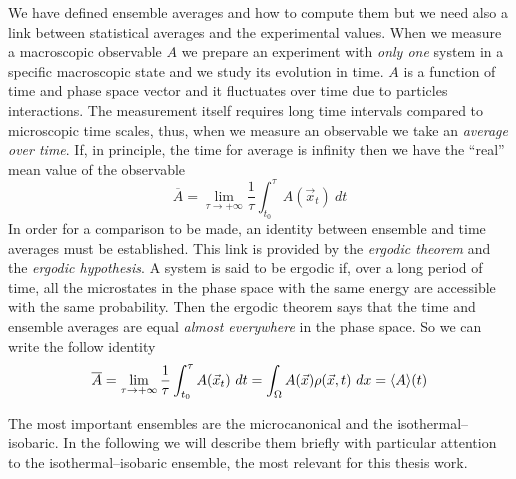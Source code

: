 We have defined ensemble averages and how to compute them but we need also a link between statistical averages and the experimental values. When we measure a macroscopic observable $A$ we prepare an experiment with \textit{only one} system in a specific macroscopic state and we study its evolution in time. $A$ is a function of time and phase space vector and it fluctuates over time due to particles interactions. The measurement itself requires long time intervals compared to microscopic time scales, thus, when we measure an observable we take an \textit{average over time}.
If, in principle, the time for average is infinity then we have the ``real'' mean value of the observable
\begin{equation*}
	\overline{A} = \lim_{\tau\to +\infty}\frac{1}{\tau}\int_{t_0}^\tau A(\vec x_t)\ dt
	\label{eq:timeAve}
\end{equation*}
In order for a comparison to be made, an identity between ensemble and time averages must be established.
This link is provided by the \textit{ergodic theorem} and the \textit{ergodic hypothesis}. A system is said to be ergodic if, over a long period of time, all the microstates in the phase space with the same energy are accessible with the same probability. Then the ergodic theorem says that the time and ensemble averages are equal \textit{almost everywhere} in the phase space. So we can write the follow identity
\begin{equation*}
	\overline{A} = \lim_{\tau\to +\infty}\frac{1}{\tau}\int_{t_0}^\tau A(\vec x_t)\ dt = \int_\Omega A(\vec x)\rho(\vec x, t)\ dx = \langle A \rangle(t)
\end{equation*}

The most important ensembles are the microcanonical and the isothermal--isobaric. In the following we will describe them briefly with particular attention to the isothermal--isobaric ensemble, the most relevant for this thesis work.

